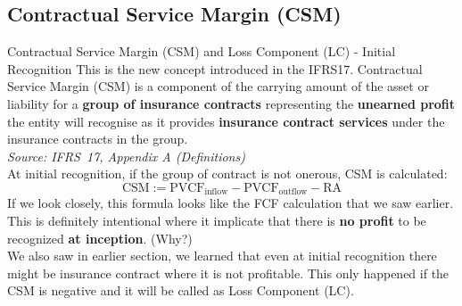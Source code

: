 \documentclass[aspectratio=169]{beamer}
\begin{document}
\subsection{Contractual Service Margin (CSM)}
\begin{frame}[allowframebreaks]{Contractual Service Margin (CSM) and Loss Component (LC) - Initial Recognition}
This is the new concept introduced in the IFRS17. Contractual Service Margin (CSM) is a component of the carrying amount of the asset or liability for a \textbf{group of insurance contracts} representing the \textbf{unearned profit} the entity will recognise as it provides \textbf{insurance contract services} under the insurance contracts in the group. \\
  \vspace{0.2em}
  \footnotesize
  \textit{Source: IFRS~17, Appendix A (Definitions)}\\
  \vspace{0.4em}
  \normalsize
At initial recognition, if the group of contract is not onerous, CSM is calculated:
\begin{equation}
\text{CSM} := \text{PVCF}_{\text{inflow}} - \text{PVCF}_{\text{outflow}} - \text{RA}
\end{equation}
If we look closely, this formula looks like the FCF calculation that we saw earlier. This is definitely intentional where it implicate that there is \textbf{no profit} to be recognized \textbf{at inception}. (Why?)\\
We also saw in earlier section, we learned that even at initial recognition there might be insurance contract where it is not profitable. This only happened if the CSM is negative and it will be called as Loss Component (LC).
\begin{center}
\pagestyle{empty}

\end{center}
\end{frame}
\end{document}
